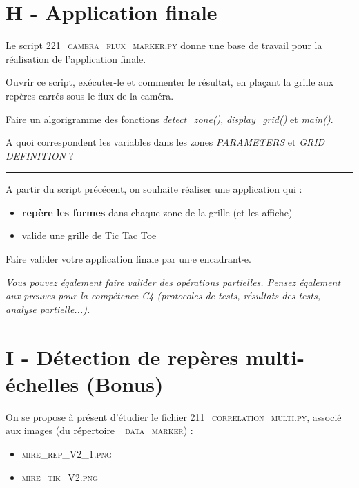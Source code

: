 \documentclass[a4paper,12pt,titlepage]{article} %
\begin{document}
\section{H - Application finale}

Le script \textsc{221\_camera\_flux\_marker.py} donne une base de travail pour la réalisation de l'application finale.

\Manip Ouvrir ce script, exécuter-le et commenter le résultat, en plaçant la grille aux repères carrés sous le flux de la caméra.

\Manip Faire un algorigramme des fonctions \textsl{detect\_zone()}, \textsl{display\_grid()} et \textsl{main()}.

\Quest A quoi correspondent les variables dans les zones \textit{PARAMETERS} et \textit{GRID DEFINITION} ?

\noindent \rule{\linewidth}{1pt}

A partir du script précécent, on souhaite réaliser une application qui : 

\begin{itemize}
	\item \textbf{repère les formes} dans chaque zone de la grille (et les affiche)
	\item valide une grille de Tic Tac Toe
\end{itemize}


\begin{mdframed}[style=sidebar,frametitle={}]
\large
Faire valider votre application finale par un$\cdot$e encadrant$\cdot$e.
\end{mdframed}

\textit{Vous pouvez également faire valider des opérations partielles. Pensez également aux preuves pour la compétence C4 (protocoles de tests, résultats des tests, analyse partielle...).}

\newpage
\section{I - Détection de repères multi-échelles (Bonus)}

On se propose à présent d'étudier le fichier \textsc{211\_correlation\_multi.py}, associé aux images (du répertoire \textsc{\_data\_marker}) :
\begin{itemize}
	\item \textsc{mire\_rep\_V2\_1.png}
	\item \textsc{mire\_tik\_V2.png}
\end{itemize}
\end{document}

